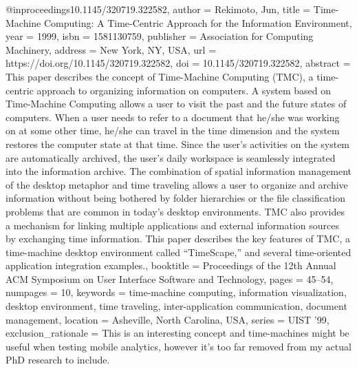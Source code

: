 @inproceedings{10.1145/320719.322582,
    author = {Rekimoto, Jun},
    title = {Time-Machine Computing: A Time-Centric Approach for the Information Environment},
    year = {1999},
    isbn = {1581130759},
    publisher = {Association for Computing Machinery},
    address = {New York, NY, USA},
    url = {https://doi.org/10.1145/320719.322582},
    doi = {10.1145/320719.322582},
    abstract = {This paper describes the concept of Time-Machine Computing (TMC), a time-centric approach
    to organizing information on computers. A system based on Time-Machine Computing allows
    a user to visit the past and the future states of computers. When a user needs to
    refer to a document that he/she was working on at some other time, he/she can travel
    in the time dimension and the system restores the computer state at that time. Since
    the user's activities on the system are automatically archived, the user's daily workspace
    is seamlessly integrated into the information archive. The combination of spatial
    information management of the desktop metaphor and time traveling allows a user to
    organize and archive information without being bothered by folder hierarchies or the
    file classification problems that are common in today's desktop environments. TMC
    also provides a mechanism for linking multiple applications and external information
    sources by exchanging time information. This paper describes the key features of TMC,
    a time-machine desktop environment called “TimeScape,” and several time-oriented application
    integration examples.},
    booktitle = {Proceedings of the 12th Annual ACM Symposium on User Interface Software and Technology},
    pages = {45–54},
    numpages = {10},
    keywords = {time-machine computing, information visualization, desktop environment, time traveling, inter-application communication, document management},
    location = {Asheville, North Carolina, USA},
    series = {UIST '99},
    exclusion_rationale = {This is an interesting concept and time-machines might be useful when testing mobile analytics, however it's too far removed from my actual PhD research to include.}
}
